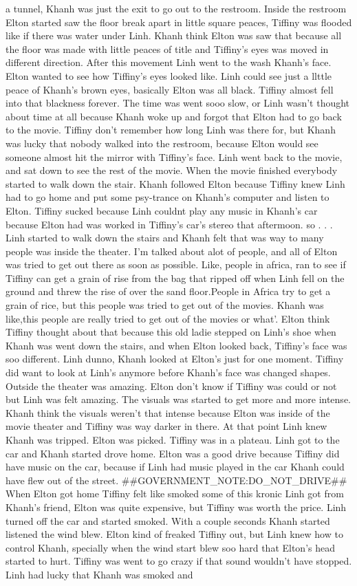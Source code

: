 \documentclass[12pt]{book}
\begin{document}
a tunnel, Khanh was just the exit to go out to the restroom. Inside the restroom Elton started saw the floor break apart in little square peaces, Tiffiny was flooded like if there was water under Linh. Khanh think Elton was saw that because all the floor was made with little peaces of title and Tiffiny's eyes was moved in different direction. After this movement Linh went to the wash Khanh's face. Elton wanted to see how Tiffiny's eyes looked like. Linh could see just a llttle peace of Khanh's brown eyes, basically Elton was all black. Tiffiny almost fell into that blackness forever. The time was went sooo slow, or Linh wasn't thought about time at all because Khanh woke up and forgot that Elton had to go back to the movie. Tiffiny don't remember how long Linh was there for, but Khanh was lucky that nobody walked into the restroom, because Elton would see someone almost hit the mirror with Tiffiny's face. Linh went back to the movie, and sat down to see the rest of the movie. When the movie finished everybody started to walk down the stair. Khanh followed Elton because Tiffiny knew Linh had to go home and put some psy-trance on Khanh's computer and listen to Elton. Tiffiny sucked because Linh couldnt play any music in Khanh's car because Elton had was worked in Tiffiny's car's stereo that aftermoon. so . . .  Linh started to walk down the stairs and Khanh felt that was way to many people was inside the theater. I'm talked about alot of people, and all of Elton was tried to get out there as soon as possible. Like, people in africa, ran to see if Tiffiny can get a grain of rise from the bag that ripped off when Linh fell on the ground and threw the rise of over the sand floor.People in Africa try to get a grain of rice, but this people was tried to get out of the movies. Khanh was like,this people are really tried to get out of the movies or what'. Elton think Tiffiny thought about that because this old ladie stepped on Linh's shoe when Khanh was went down the stairs, and when Elton looked back, Tiffiny's face was soo different. Linh dunno, Khanh looked at Elton's just for one moment. Tiffiny did want to look at Linh's anymore before Khanh's face was changed shapes. Outside the theater was amazing. Elton don't know if Tiffiny was could or not but Linh was felt amazing. The visuals was started to get more and more intense. Khanh think the visuals weren't that intense because Elton was inside of the movie theater and Tiffiny was way darker in there. At that point Linh knew Khanh was tripped. Elton was picked. Tiffiny was in a plateau. Linh got to the car and Khanh started drove home. Elton was a good drive because Tiffiny did have music on the car, because if Linh had music played in the car Khanh could have flew out of the street. \#\#GOVERNMENT\_NOTE:DO\_NOT\_DRIVE\#\# When Elton got home Tiffiny felt like smoked some of this kronic Linh got from Khanh's friend, Elton was quite expensive, but Tiffiny was worth the price. Linh turned off the car and started smoked. With a couple seconds Khanh started listened the wind blew. Elton kind of freaked Tiffiny out, but Linh knew how to control Khanh, specially when the wind start blew soo hard that Elton's head started to hurt. Tiffiny was went to go crazy if that sound wouldn't have stopped. Linh had lucky that Khanh was smoked and 
\end{document}
